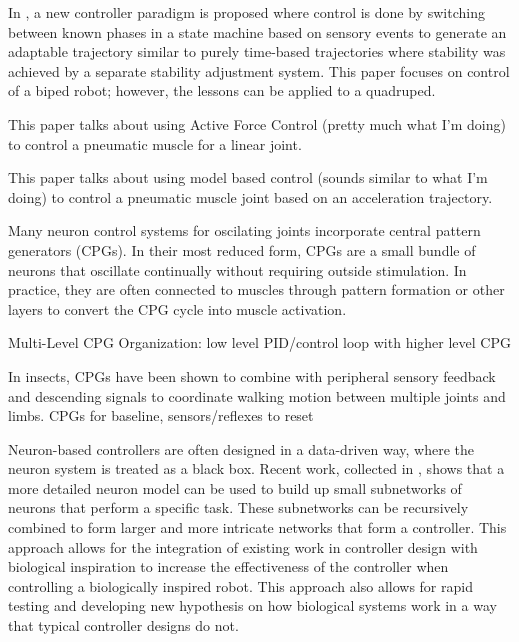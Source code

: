 
In \cite{EventBasedWalking}, a new controller paradigm is proposed where control
is done by switching between known phases in a state machine based on sensory
events to generate an adaptable trajectory similar to purely time-based
trajectories where stability was achieved by a separate stability adjustment
system. This paper focuses on control of a biped robot; however, the lessons can
be applied to a quadruped.


This paper talks about using Active Force Control (pretty much what I'm doing)
to control a pneumatic muscle for a linear joint.
\cite{Jahanabadi2009}

This paper talks about using model based control (sounds similar to what I'm 
doing) to control a pneumatic muscle joint based on an acceleration trajectory.
\cite{Wang2013}




Many neuron control systems for oscilating joints incorporate central pattern
generators (CPGs). In their most reduced form, CPGs are a small bundle of
neurons that oscillate continually without requiring outside stimulation. In
practice, they are often connected to muscles through pattern formation or other
layers to convert the CPG cycle into muscle activation.
\cite{CPGReview}

Multi-Level CPG Organization: low level PID/control loop with higher level CPG
\cite{MultiLevelCPG}

In insects, CPGs have been shown to combine with peripheral sensory feedback and
descending signals to coordinate walking motion between multiple joints and
limbs.
CPGs for baseline, sensors/reflexes to reset \cite{SixLeggedWalking}


Neuron-based controllers are often designed in a data-driven way, where the
neuron system is treated as a black box. Recent work, collected in 
\cite{NickFunctionalSubnetwork}, shows that a more detailed neuron model can be
used to build up small subnetworks of neurons that perform a specific task.
These subnetworks can be recursively combined to form larger and more intricate
networks that form a controller. This approach allows for the integration of
existing work in controller design with biological inspiration to increase the
effectiveness of the controller when controlling a biologically inspired robot.
This approach also allows for rapid testing and developing new hypothesis on how
biological systems work in a way that typical controller designs do not.